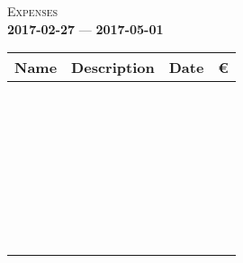 \documentclass[12pt]{article}
\begin{document}

\begin{center}
  \large
  \textsc{Expenses}\\
  \small
  \textbf{2017-02-27} --- \textbf{2017-05-01}\\[0.5cm]

  \small
  \begin{tabular}{|K{4.0cm}|K{7.5cm}|K{2.5cm}|K{1.5cm}|}
    \hline
    \textbf{Name} & \textbf{Description} & \textbf{Date} & \euro \\ \hline
    \hline
    & & & \\[0.25cm] \hline
    & & & \\[0.25cm] \hline
    & & & \\[0.25cm] \hline
    & & & \\[0.25cm] \hline
    & & & \\[0.25cm] \hline
    & & & \\[0.25cm] \hline
    & & & \\[0.25cm] \hline
    & & & \\[0.25cm] \hline
    & & & \\[0.25cm] \hline
    & & & \\[0.25cm] \hline
    & & & \\[0.25cm] \hline
    & & & \\[0.25cm] \hline
    & & & \\[0.25cm] \hline
    & & & \\[0.25cm] \hline
    & & & \\[0.25cm] \hline
    & & & \\[0.25cm] \hline
    & & & \\[0.25cm] \hline
    & & & \\[0.25cm] \hline
    & & & \\[0.25cm] \hline
    & & & \\[0.25cm] \hline
    & & & \\[0.25cm] \hline
    & & & \\[0.25cm] \hline
    & & & \\[0.25cm] \hline
    & & & \\[0.25cm] \hline
    & & & \\[0.25cm] \hline
    & & & \\[0.25cm] \hline
    & & & \\[0.25cm] \hline
    & & & \\[0.25cm] \hline
    & & & \\[0.25cm] \hline
    & & & \\[0.25cm] \hline
    & & & \\[0.25cm] \hline
    & & & \\[0.25cm] \hline
  \end{tabular}
\end{center}
\end{document}
